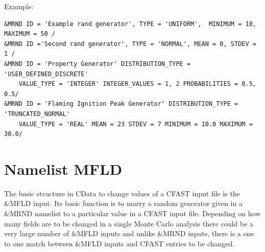 \documentclass[12pt,twoside]{book}
\begin{document}
\vspace{\baselineskip}
\noindent Example:
\begin{lstlisting}[basicstyle=\scriptsize]
&MRND ID = 'Example rand generator', TYPE = 'UNIFORM',  MINIMUM = 10, MAXIMUM = 50 /
&MRND ID ='Second rand generator', TYPE = 'NORMAL', MEAN = 0, STDEV = 1 /
&MRND ID = 'Property Generator' DISTRIBUTION_TYPE = 'USER_DEFINED_DISCRETE'
    VALUE_TYPE = 'INTEGER' INTEGER_VALUES = 1, 2 PROBABILITIES = 0.5, 0.5/
&MRND ID = 'Flaming Ignition Peak Generator' DISTRIBUTION_TYPE = 'TRUNCATED_NORMAL'
    VALUE_TYPE = 'REAL' MEAN = 23 STDEV = 7 MINIMUM = 10.0 MAXIMUM = 30.0/
\end{lstlisting}

\section{Namelist MFLD}
\label{info:MFLD}

The basic structure in CData to change values of a CFAST input file is the { \ct \&MFLD} input. Its basic function is to marry a random generator given in a { \ct \&MRND} namelist to a particular value in a CFAST input file. Depending on how many fields are to be changed in a single Monte Carlo analysis there could be a very large number of { \ct \&MFLD} inputs and unlike { \ct \&MRND } inputs, there is a one to one match between { \ct \&MFLD} inputs and CFAST entries to be changed.
\end{document}
